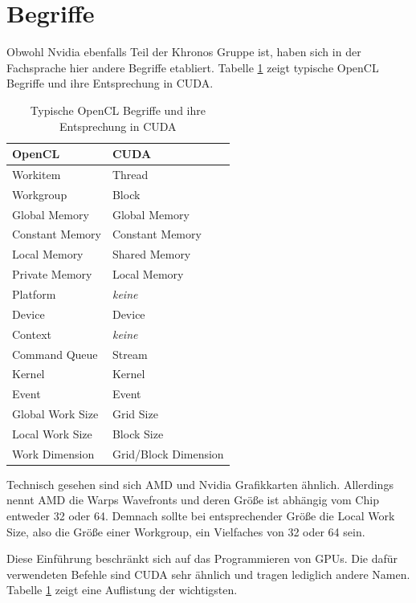 	    \section{Begriffe}
	    Obwohl Nvidia ebenfalls Teil der Khronos Gruppe ist, haben sich in der Fachsprache hier andere Begriffe etabliert. Tabelle \ref{tab4:begriffe} zeigt typische OpenCL Begriffe und ihre Entsprechung in CUDA.
	    	\begin{table}[h]
	    		\centering
	    		\begin{tabular}{ll}
	    			\toprule 
	    			\textbf{OpenCL} & \textbf{CUDA} \\ \hline
	    			Workitem & Thread \\
	    			Workgroup & Block \\ \hline
	    			Global Memory & Global Memory \\
	    			Constant Memory & Constant Memory \\
	    			Local Memory & Shared Memory \\
	    			Private Memory & Local Memory \\ \hline
	    			Platform & \textit{keine} \\
	    			Device & Device \\
	    			Context & \textit{keine} \\
	    			Command Queue & Stream \\
	    			Kernel & Kernel \\
	    			Event & Event \\ \hline
	    			Global Work Size & Grid Size \\
	    			Local Work Size & Block Size \\
	    			Work Dimension & Grid/Block Dimension \\
	    			\bottomrule
	    		\end{tabular}
	    		\caption{Typische OpenCL Begriffe und ihre Entsprechung in CUDA}
	    		\label{tab4:begriffe}
	    	\end{table}
	    	Technisch gesehen sind sich AMD und Nvidia Grafikkarten ähnlich. Allerdings nennt AMD die \Glspl{Warp} \Glspl{Wavefront} und deren Größe ist abhängig vom Chip entweder 32 oder 64. Demnach sollte bei entsprechender Größe die Local Work Size, also die Größe einer \Gls{Workgroup}, ein Vielfaches von 32 oder 64 sein. 
	    	
	    	Diese Einführung beschränkt sich auf das Programmieren von GPUs. Die dafür verwendeten Befehle sind CUDA sehr ähnlich und tragen lediglich andere Namen. Tabelle \ref{tab4:begriffe} zeigt eine Auflistung der wichtigsten.
	    	
